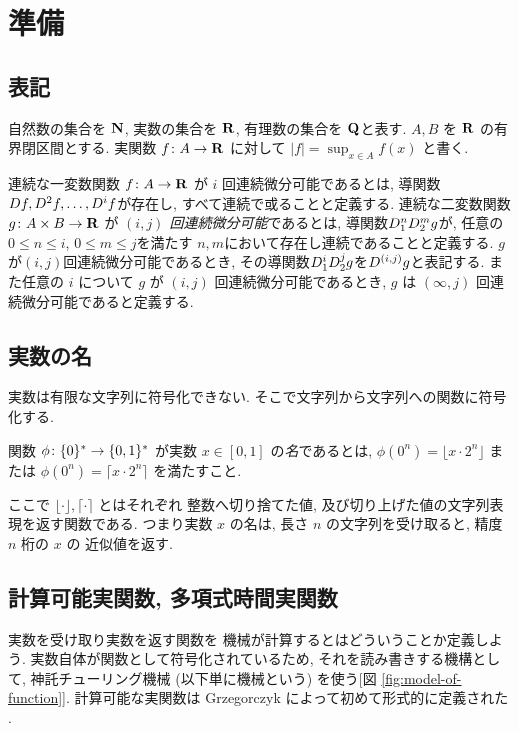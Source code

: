\section{準備}
\label{section: preliminaries}

\subsection{表記}
自然数の集合を $\mathbf N$, 実数の集合を $\mathbf R$, 
有理数の集合を $\mathbf Q$と表す.
$A, B$ を $\mathbf R$ の有界閉区間とする. 
実関数 $f \colon A \to \mathbf R$ に対して $|f| = \sup_{x \in A} f(x)$ と書く.

連続な一変数関数 $f\colon A \to \mathbf R$ が $i$ 回連続微分可能であるとは,
導関数$D f, D^2 f, \dots, D^i f$が存在し, すべて連続で或ることと定義する.
連続な二変数関数 $g \colon A \times B \to \mathbf R$ が
\emph{$(i, j)$ 回連続微分可能}であるとは,
導関数$D_1^n D_2^m g$が, 任意の$0 \le n \le i$, $0 \le m \le j$を満たす
$n,m$において存在し連続であることと定義する.
$g$が$(i,j)$回連続微分可能であるとき,
その導関数$D_1^i D_2^j g$を$D^{(i,j)}g$と表記する.
また任意の $i$ について $g$ が $(i, j)$ 回連続微分可能であるとき,
$g$ は $(\infty, j)$ 回連続微分可能であると定義する.

\subsection{実数の名}
 実数は有限な文字列に符号化できない. 
 そこで文字列から文字列への関数に符号化する.
 \begin{definition}[実数の名]
  関数 $\phi \colon \{0\}^* \to \{0, 1\}^*$ が実数 $x \in [0,1]$ の\emph{名}であるとは,
  $\phi(0^n) = \lfloor x \cdot 2^n \rfloor$ または
  $\phi(0^n) = \lceil x \cdot 2^n \rceil$ を満たすこと.
 \end{definition}
ここで $\lfloor \cdot \rfloor, \lceil \cdot \rceil$ とはそれぞれ
整数へ切り捨てた値, 及び切り上げた値の文字列表現を返す関数である.
つまり実数 $x$ の名は, 
長さ $n$ の文字列を受け取ると, 精度 $n$ 桁の $x$ の
近似値を返す.



\subsection{計算可能実関数, 多項式時間実関数}

実数を受け取り実数を返す関数を
機械が計算するとはどういうことか定義しよう. 
実数自体が関数として符号化されているため, 
それを読み書きする機構として, 
神託チューリング機械 (以下単に機械という) を使う[図 \ref{fig:model-of-function}].
計算可能な実関数は Grzegorczyk によって初めて形式的に定義された
\cite{grzegorczyk1955computable}.

